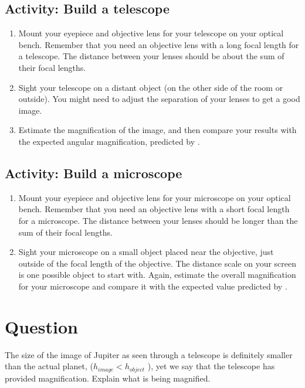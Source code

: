 \begin{multicols}{2}
\subsection{Activity: Build a telescope}
 
\begin{enumerate}
	\item Mount your eyepiece and objective lens for your telescope on your optical bench. Remember that you need an objective lens with a long focal length for a telescope. The distance between your lenses should be about the sum of their focal lengths.
	\item Sight your telescope on a distant object (on the other side of the room or outside). You might need to adjust the separation of your lenses to get a good image. 
	\item Estimate the magnification of the image, and then compare your results with the expected angular magnification, predicted by .
\end{enumerate}

\subsection{Activity: Build a microscope}

\begin{enumerate}
	\item Mount your eyepiece and objective lens for your microscope on your optical bench. Remember that you need an objective lens with a short focal length for a microscope. The distance between your lenses should be longer than the sum of their focal lengths.
	\item Sight your microscope on a small object placed near the objective, just outside of the focal length of the objective. The distance scale on your screen is one possible object to start with. Again, estimate the overall magnification for your microscope and compare it with the expected value predicted by .
\end{enumerate}

\section{Question} 
The size of the image of Jupiter as seen through a telescope is definitely
smaller than the actual planet, ($h_{image} < h_{object}$ ), yet we say that the telescope has provided magnification. Explain what is being magnified.

\end{multicols}
\endinput
